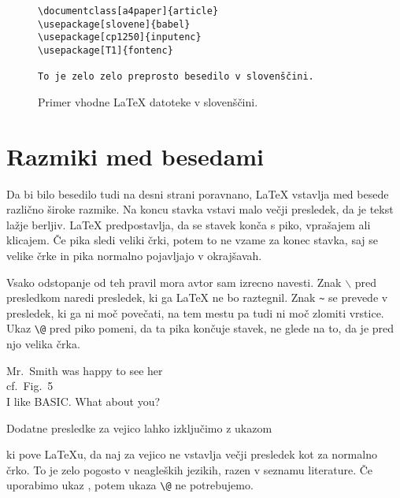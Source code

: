 \begin{figure}[!bp]
\begin{lined}{10cm}
\begin{verbatim}
\documentclass[a4paper]{article}
\usepackage[slovene]{babel}
\usepackage[cp1250]{inputenc}
\usepackage[T1]{fontenc}

To je zelo zelo preprosto besedilo v slovenščini.

\end{verbatim}
\end{lined}
\caption{Primer vhodne \LaTeX{} datoteke v slovenščini.} \label{sloslika}
\end{figure}

\section{Razmiki med besedami}

Da bi bilo besedilo tudi na desni strani poravnano, \LaTeX{} vstavlja med besede različno široke razmike. 
Na koncu stavka vstavi malo večji presledek, da je tekst lažje berljiv. \LaTeX{}
predpostavlja, da se stavek konča s piko, vprašajem ali klicajem. Če pika sledi veliki črki, potem 
to ne vzame za konec stavka, saj se velike črke in pika normalno pojavljajo v okrajšavah.

Vsako odstopanje od teh pravil mora avtor sam izrecno navesti.
Znak $\backslash$ pred presledkom
naredi presledek, ki ga \LaTeX{} ne bo raztegnil. Znak \verb|~| se prevede v presledek, ki ga ni moč povečati,
na tem mestu pa tudi ni moč zlomiti vrstice. Ukaz 
\verb|\@| pred piko pomeni, da ta pika končuje stavek, ne glede na to, da je pred njo 
velika črka.
  

\begin{example}
Mr.~Smith was happy to see her\\
cf.~Fig.~5\\
I like BASIC\@. What about you?
\end{example}

Dodatne presledke za vejico lahko izključimo z ukazom
\begin{lscommand}
\end{lscommand}
\noindent ki pove \LaTeX{}u, da naj za vejico ne vstavlja večji presledek kot za normalno črko. To je zelo pogosto
v neagleških jezikih, razen v seznamu literature. Če uporabimo ukaz
, potem ukaza \verb|\@| ne potrebujemo.

